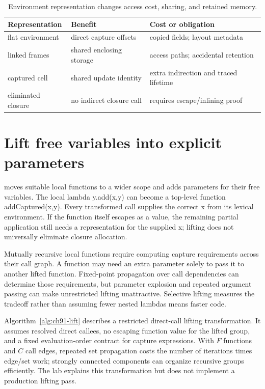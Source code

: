 \begin{table}[htbp]
\caption{Environment representation changes access cost, sharing, and retained memory.}
\label{tab:ch91-layouts}
\centering
\begin{tabular}{lll}
\toprule
Representation & Benefit & Cost or obligation \\
\midrule
flat environment & direct capture offsets & copied fields; layout metadata \\
linked frames & shared enclosing storage & access paths; accidental retention \\
captured cell & shared update identity & extra indirection and traced lifetime \\
eliminated closure & no indirect closure call & requires escape/inlining proof \\
\bottomrule
\end{tabular}
\end{table}

\section{Lift free variables into explicit parameters}
\label{sec:ch91-lifting}
 moves suitable local functions to a wider scope and adds parameters for their free variables.
The local lambda y.add(x,y) can become a top-level function addCaptured(x,y).
Every transformed call supplies the correct x from its lexical environment.
If the function itself escapes as a value, the remaining partial application still needs a representation for the supplied x; lifting does not universally eliminate closure allocation.

Mutually recursive local functions require computing capture requirements across their call graph.
A function may need an extra parameter solely to pass it to another lifted function.
Fixed-point propagation over call dependencies can determine those requirements, but parameter explosion and repeated argument passing can make unrestricted lifting unattractive.
Selective lifting measures the tradeoff rather than assuming fewer nested lambdas means faster code.

Algorithm~\ref{alg:ch91-lift} describes a restricted direct-call lifting transformation.
It assumes resolved direct callees, no escaping function value for the lifted group, and a fixed evaluation-order contract for capture expressions.
With $F$ functions and $C$ call edges, repeated set propagation costs the number of iterations times edge/set work; strongly connected components can organize recursive groups efficiently.
The lab explains this transformation but does not implement a production lifting pass.

